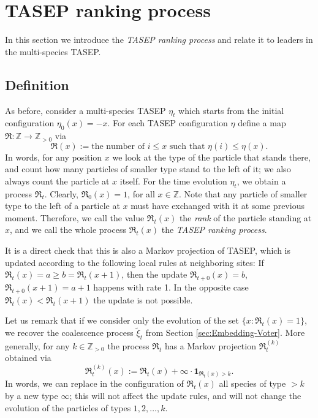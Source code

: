 \documentclass[11pt,reqno]{amsart}
\theoremstyle{definition}
\theoremstyle{remark}
\theoremstyle{remark}
\def\leq{\leqslant}
\def\geq{\geqslant}
\renewcommand\le{\leq}
\renewcommand\ge{\geq}
\def\Z{\mathbb Z}
\numberwithin{equation}{section}
\begin{document}
	\section{TASEP ranking process}
	\label{sec:Ranking}
	
	In this section we introduce the \textit{TASEP ranking process} and relate it to leaders in the multi-species TASEP. 
	
	\subsection{Definition}
	
	As before, consider a multi-species TASEP $\eta_t$ which starts from the initial configuration $\eta_0(x)=-x$. For each TASEP configuration $\eta$ define a map $\mathfrak{R}: \Z \to \Z_{> 0}$ via
	$$
	\mathfrak{R} (x) := \mbox{the number of $i \le x$ such that $\eta (i) \le \eta (x)$.}
	$$
	In words, for any position $x$ we look at the type of the particle that stands there, and count how many particles of smaller type stand to the left of it; we also always count the particle at $x$ itself. For the time evolution $\eta_t$, we obtain a process $\mathfrak{R}_t$. Clearly, $\mathfrak{R}_0 (x) = 1$, for all $x \in \Z$. Note that any particle of smaller type to the left of a particle at $x$ must have exchanged with it at some previous moment. Therefore, we call the value $\mathfrak{R}_t (x)$ the \textit{rank} of the particle standing at $x$, and we call the whole process $\mathfrak{R}_t (x)$ the \textit{TASEP ranking process}. 
	
	It is a direct check that this is also a Markov projection of TASEP, which is updated according to the following local rules at neighboring sites: If $ \mathfrak{R}_t (x) = a \ge b = \mathfrak{R}_t (x+1)$, then the update $\mathfrak{R}_{t+0} (x) = b$, $\mathfrak{R}_{t+0} (x+1)=a+1$ happens with rate 1. In the opposite case $ \mathfrak{R}_t (x) < \mathfrak{R}_t (x+1)$ the update is not possible.
	
	Let us remark that if we consider only the evolution of the set $\{x: \mathfrak{R}_{t} (x)=1\}$, we recover the coalescence process $\tilde \xi_t$ from Section \ref{sec:Embedding-Voter}. More generally, for any $k \in \Z_{> 0}$ the process $\mathfrak{R}_{t}$ has a Markov projection $\mathfrak{R}_{t}^{(k)}$ obtained via
	$$
	\mathfrak{R}_{t}^{(k)} (x) := \mathfrak{R}_{t} (x) + \infty \cdot \mathbf{1}_{\mathfrak{R}_{t} (x) >k}.
	$$
	In words, we can replace in the configuration of $\mathfrak{R}_{t} (x)$ all species of type $>k$ by a new type $\infty$; this will not affect the update rules, and will not change the evolution of the particles of types $1,2, \dots, k$. 
	
\end{document}
